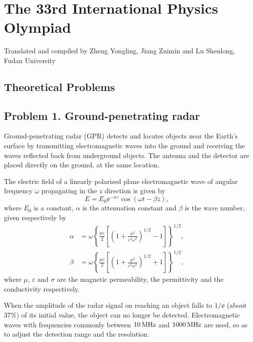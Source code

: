 \section*{The 33rd International Physics Olympiad}

\begin{center}
\small Translated and compiled by Zheng Yongling, Jiang Zuimin and Lu Shenlong, Fudan University
\end{center}

\subsection*{Theoretical Problems}

\subsection*{Problem 1. Ground-penetrating radar}

Ground-penetrating radar (GPR) detects and locates objects near the Earth's surface by transmitting electromagnetic waves into the ground and receiving the waves reflected back from underground objects. The antenna and the detector are placed directly on the ground, at the same location.

The electric field of a linearly polarised plane electromagnetic wave of angular frequency $\omega$ propagating in the $z$ direction is given by
\begin{equation}
E=E_0\ee^{-\alpha z}\cos(\omega t-\beta z), \tag{1}
\end{equation}
where $E_0$ is a constant, $\alpha$ is the attenuation constant and $\beta$ is the wave number, given respectively by
\begin{equation}
\begin{aligned}
\alpha&=\omega\left\{\frac{\mu\varepsilon}{2}\left[\left(1+\frac{\sigma^2}{\varepsilon^2\omega^2}\right)^{1/2}-1\right]\right\}^{1/2},\\
\beta&=\omega\left\{\frac{\mu\varepsilon}{2}\left[\left(1+\frac{\sigma^2}{\varepsilon^2\omega^2}\right)^{1/2}+1\right]\right\}^{1/2},
\end{aligned}\tag{2}
\end{equation}
where $\mu$, $\varepsilon$ and $\sigma$ are the magnetic permeability, the permittivity and the conductivity respectively.

When the amplitude of the radar signal on reaching an object falls to $1/\ee$ (about $37\%$) of its initial value, the object can no longer be detected. Electromagnetic waves with frequencies commonly between $10\,\mathrm{MHz}$ and $1000\,\mathrm{MHz}$ are used, so as to adjust the detection range and the resolution.

